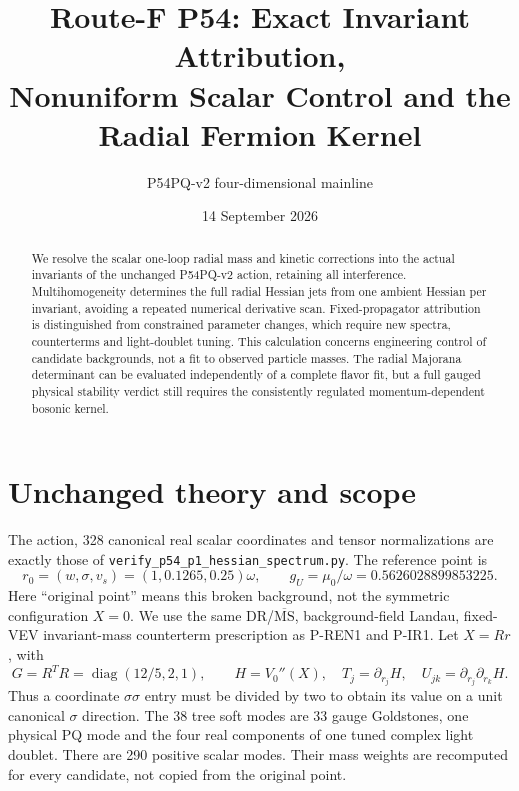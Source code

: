 \documentclass[11pt]{article}
\title{Route-F P54: Exact Invariant Attribution,\\
Nonuniform Scalar Control and the Radial Fermion Kernel}
\author{P54PQ-v2 four-dimensional mainline}
\date{14 September 2026}
\newcommand{\diag}{\operatorname{diag}}
\newcommand{\MS}{\overline{\mathrm{MS}}}
\begin{document}
\maketitle
\begin{abstract}
We resolve the scalar one-loop radial mass and kinetic corrections into
the actual invariants of the unchanged P54PQ-v2 action, retaining all
interference. Multihomogeneity determines the full radial Hessian jets
from one ambient Hessian per invariant, avoiding a repeated numerical
derivative scan. Fixed-propagator attribution is distinguished from
constrained parameter changes, which require new spectra, counterterms
and light-doublet tuning. This calculation concerns engineering control
of candidate backgrounds, not a fit to observed particle masses. The
radial Majorana determinant can be evaluated independently of a complete
flavor fit, but a full gauged physical stability verdict still requires
the consistently regulated momentum-dependent bosonic kernel.
\end{abstract}

\section{Unchanged theory and scope}
The action, 328 canonical real scalar coordinates and tensor
normalizations are exactly those of
\texttt{verify\_p54\_p1\_hessian\_spectrum.py}.
The reference point is
\begin{equation}
 r_0=(w,\sigma,v_s)=(1,0.1265,0.25)\omega,
 \qquad g_U=\mu_0/\omega=0.5626028899853225.
\end{equation}
Here ``original point'' means this broken background, not the symmetric
configuration $X=0$. We use the same DR/$\MS$, background-field Landau,
fixed-VEV invariant-mass counterterm prescription as P-REN1 and P-IR1.
Let $X=Rr$, with
\begin{equation}
 G=R^TR=\diag(12/5,2,1),\qquad
 H=V_0''(X),\quad T_j=\partial_{r_j}H,\quad
 U_{jk}=\partial_{r_j}\partial_{r_k}H.
\end{equation}
Thus a coordinate $\sigma\sigma$ entry must be divided by two to
obtain its value on a unit canonical $\sigma$ direction. The 38 tree
soft modes are 33 gauge Goldstones, one physical PQ mode and the four
real components of one tuned complex light doublet. There are 290
positive scalar modes. Their mass weights are recomputed for every
candidate, not copied from the original point.
\end{document}
